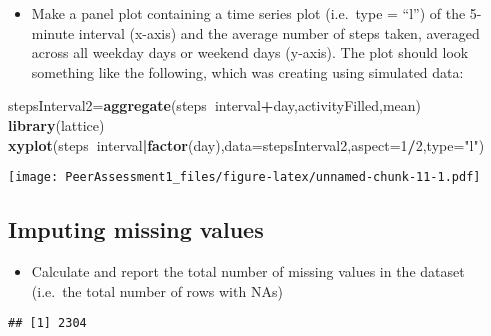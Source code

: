 \documentclass[]{article}
\newenvironment{Shaded}{\begin{snugshade}}{\end{snugshade}}
\newcommand{\KeywordTok}[1]{\textcolor[rgb]{0.13,0.29,0.53}{\textbf{#1}}}
\newcommand{\DataTypeTok}[1]{\textcolor[rgb]{0.13,0.29,0.53}{#1}}
\newcommand{\DecValTok}[1]{\textcolor[rgb]{0.00,0.00,0.81}{#1}}
\newcommand{\StringTok}[1]{\textcolor[rgb]{0.31,0.60,0.02}{#1}}
\newcommand{\OperatorTok}[1]{\textcolor[rgb]{0.81,0.36,0.00}{\textbf{#1}}}
\newcommand{\NormalTok}[1]{#1}
\providecommand{\tightlist}{%
  \setlength{\itemsep}{0pt}\setlength{\parskip}{0pt}}
\begin{document}
\begin{itemize}
\tightlist
\item
  Make a panel plot containing a time series plot (i.e.~type = ``l'') of
  the 5-minute interval (x-axis) and the average number of steps taken,
  averaged across all weekday days or weekend days (y-axis). The plot
  should look something like the following, which was creating using
  simulated data:
\end{itemize}

\begin{Shaded}
\begin{Highlighting}[]
\NormalTok{stepsInterval2=}\KeywordTok{aggregate}\NormalTok{(steps}\OperatorTok{~}\NormalTok{interval}\OperatorTok{+}\NormalTok{day,activityFilled,mean)}
\KeywordTok{library}\NormalTok{(lattice)}
\KeywordTok{xyplot}\NormalTok{(steps}\OperatorTok{~}\NormalTok{interval}\OperatorTok{|}\KeywordTok{factor}\NormalTok{(day),}\DataTypeTok{data=}\NormalTok{stepsInterval2,}\DataTypeTok{aspect=}\DecValTok{1}\OperatorTok{/}\DecValTok{2}\NormalTok{,}\DataTypeTok{type=}\StringTok{"l"}\NormalTok{)}
\end{Highlighting}
\end{Shaded}

\texttt{[image: PeerAssessment1\_files/figure-latex/unnamed-chunk-11-1.pdf]}

\subsection{Imputing missing values}\label{imputing-missing-values}

\begin{itemize}
\tightlist
\item
  Calculate and report the total number of missing values in the dataset
  (i.e.~the total number of rows with NAs)
\end{itemize}

\begin{Shaded}
\end{Shaded}

\begin{verbatim}
## [1] 2304
\end{verbatim}
\end{document}
